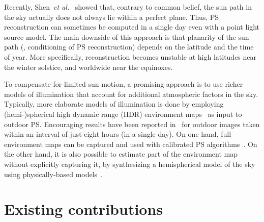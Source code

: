\documentclass{report}
\begin{document}
Recently, Shen~{\em et al.}~\cite{shen-pg-14} showed that, contrary to common belief, the sun path in the sky actually does not always lie within a perfect plane. Thus, PS reconstruction can sometimes be computed in a single day even with a point light source model. The main downside of this approach is that planarity of the sun path (\ie, conditioning of PS reconstruction) depends on the latitude and the time of year. More specifically, reconstruction becomes unstable at high latitudes near the winter solstice, and worldwide near the equinoxes.

To compensate for limited sun motion, a promising approach is to use richer models of illumination that account for additional atmospheric factors in the sky. Typically, more elaborate models of illumination is done by employing (hemi-)spherical high dynamic range (HDR) environment maps~\cite{debevec-siggraph-98,reinhard-book-05} as input to outdoor PS. Encouraging results have been reported in~\cite{yu-iccp-13} for outdoor images taken within an interval of just eight hours (in a single day). On one hand, full environment maps can be captured and used with calibrated PS algorithms~\cite{yu-iccp-13,shi-3dv-14,hung-wacv-15}. On the other hand, it is also possible to estimate part of the environment map without explicitly capturing it, by synthesizing a hemispherical model of the sky using physically-based models~\cite{inose-tcva-13,jung-cvpr-15}.



\chapter{Existing contributions}
\label{ch:existing}
\end{document}
